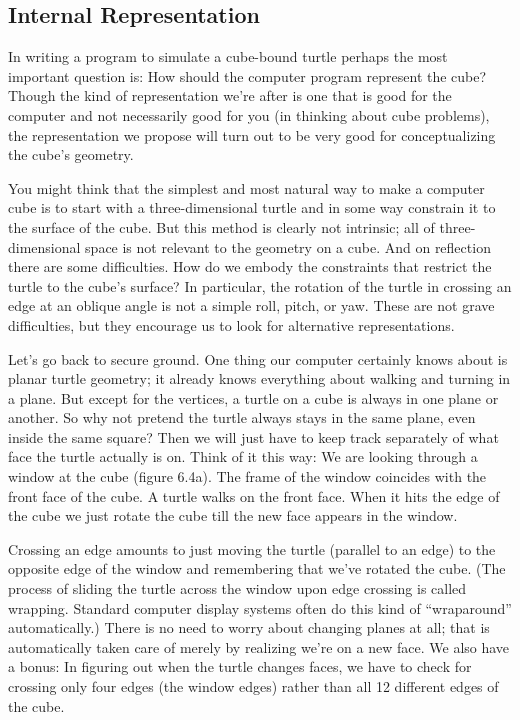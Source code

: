 \documentclass{book}
\begin{document}
\subsection{Internal Representation}

In writing a program to simulate a cube-bound turtle perhaps the most
important question is: How should the computer program represent the
cube? Though the kind of representation we're after is one that is good
for the computer and not necessarily good for you (in thinking about
cube problems), the representation we propose will turn out to be very
good for conceptualizing the cube's geometry.

You might think that the simplest and most natural way to make a
computer cube is to start with a three-dimensional turtle and in some
way constrain it to the surface of the cube. But this method is clearly not
intrinsic; all of three-dimensional space is not relevant to the geometry
on a cube. And on reflection there are some difficulties. How do we
embody the constraints that restrict the turtle to the cube's surface? In
particular, the rotation of the turtle in crossing an edge at an oblique
angle is not a simple roll, pitch, or yaw. These are not grave difficulties,
but they encourage us to look for alternative representations.

Let's go back to secure ground. One thing our computer certainly
knows about is planar turtle geometry; it already knows everything
about walking and turning in a plane. But except for the vertices, a
turtle on a cube is always in one plane or another. So why not pretend
the turtle always stays in the same plane, even inside the same square?
Then we will just have to keep track separately of what face the turtle
actually is on. Think of it this way: We are looking through a window
at the cube (figure 6.4a). The frame of the window coincides with the
front face of the cube. A turtle walks on the front face. When it hits
the edge of the cube we just rotate the cube till the new face appears in
the window.

Crossing an edge amounts to just moving the turtle (parallel to an
edge) to the opposite edge of the window and remembering that we've
rotated the cube. (The process of sliding the turtle across the window
upon edge crossing is called wrapping. Standard computer display systems often do this kind of ``wraparound'' automatically.) There is no
need to worry about changing planes at all; that is automatically taken
care of merely by realizing we're on a new face. We also have a bonus: In
figuring out when the turtle changes faces, we have to check for crossing
only four edges (the window edges) rather than all 12 different edges of
the cube.
\end{document}
